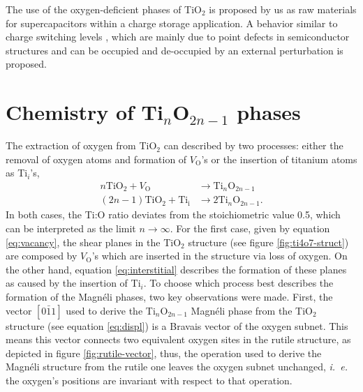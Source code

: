 The use of the oxygen-deficient phases of TiO$_2$ is proposed by us as raw materials for supercapacitors within a charge storage application. A behavior similar to charge switching levels \cite{Young2015}, which are mainly due to point defects in semiconductor structures and can be occupied and de-occupied by an external perturbation is proposed.

\section{Chemistry of Ti$_n$O$_{2n-1}$ phases}
\label{sec:formation}

The extraction of oxygen from TiO$_2$ can described by two processes: either the removal of oxygen atoms and formation of $V_{\text{O}}$'s or the insertion of titanium atoms as Ti$_i$'s,
\begin{align}
	n\text{TiO}_2 + V_{\text{O}} & \rightarrow \text{Ti}_n\text{O}_{2n-1} \label{eq:vacancy} \\
    (2n-1)\text{TiO}_2 + \text{Ti}_{\text{i}} & \rightarrow 2\text{Ti}_n\text{O}_{2n-1}. \label{eq:interstitial}
\end{align}
In both cases, the Ti:O ratio deviates from the stoichiometric value 0.5, which can be interpreted as the limit $n \rightarrow \infty$. For the first case, given by equation \ref{eq:vacancy}, the shear planes in the TiO$_2$ structure (see figure \ref{fig:ti4o7-struct}) are composed by $V_{\text{O}}$'s which are inserted in the structure via loss of oxygen. On the other hand, equation \ref{eq:interstitial} describes the formation of these planes as caused by the insertion of Ti$_i$. To choose which process best describes the formation of the Magnéli phases, two key observations were made. First, the vector $[0\bar{1}1]$ used to derive the Ti$_n$O$_{2n-1}$ Magnéli phase from the TiO$_2$ structure (see equation \ref{eq:displ}) is a Bravais vector of the oxygen subnet. This means this vector connects two equivalent oxygen sites in the rutile structure, as depicted in figure \ref{fig:rutile-vector}, thus, the operation used to derive the Magnéli structure from the rutile one leaves the oxygen subnet unchanged, \textit{i.\ e.} the oxygen's positions are invariant with respect to that operation.
